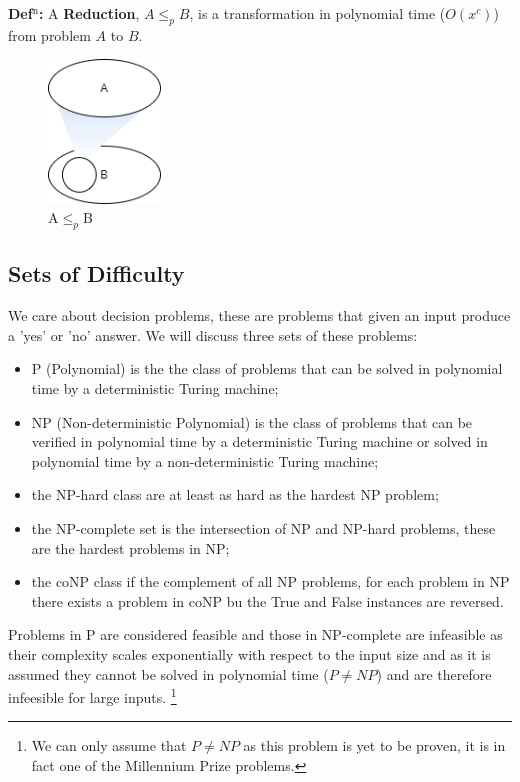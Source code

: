 \documentclass[a4paper,11pt]{report}
\begin{document}
\textbf{Def$^\text{n}$:} A \textbf{Reduction}, $A \leq_p B$, is a transformation in polynomial time ($O(x^c)$) from problem $A$ to $B$.

\begin{figure}[h!]
	\begin{center}
		\includegraphics[width=30mm]{figures/reduction.png}
	\end{center}
	\caption{\label{fig:reduction}A$\leq_p$B}
\end{figure}

\subsection{Sets of Difficulty} 

We care about decision problems, these are problems that given an input produce a 'yes' or 'no' answer. We will discuss three sets of these problems:
\begin{itemize}
\item{P (Polynomial) is the the class of problems that can be solved in polynomial time by a deterministic Turing machine;}
\item{NP (Non-deterministic Polynomial) is the class of problems that can be verified in polynomial time by a deterministic Turing machine or solved in polynomial time by a non-deterministic Turing machine;}
\item{the NP-hard class are at least as hard as the hardest NP problem;} 
\item{the NP-complete set is the intersection of NP and NP-hard problems, these are the hardest problems in NP;} 
\item{the coNP class if the complement of all NP problems, for each problem in NP there exists a problem in coNP bu the True and False instances are reversed.}
\end{itemize}

Problems in P are considered feasible and those in NP-complete are infeasible as their complexity scales exponentially with respect to the input size and as it is assumed they cannot be solved in polynomial time ($P \neq NP$) and are therefore infeesible for large inputs. \footnote{We can only assume that $P\neq NP$ as this problem is yet to be proven, it is in fact one of the Millennium Prize problems.}
\end{document}

